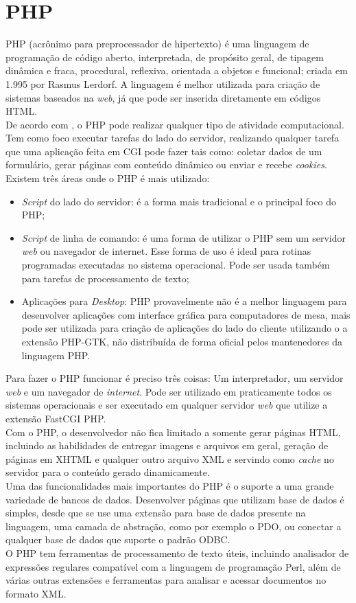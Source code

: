\section{PHP}
PHP (acrônimo para preprocessador de hipertexto) é uma linguagem de programação 
de código aberto, interpretada, de propósito geral, de tipagem dinâmica e 
fraca, procedural, reflexiva, orientada a objetos e funcional; criada em 1.995 
por Rasmus Lerdorf. A linguagem é melhor utilizada para criação de sistemas 
baseados na \textit{web}, já que pode ser inserida diretamente em códigos 
HTML.\\
De acordo com , o PHP pode realizar qualquer tipo de 
atividade computacional. Tem como foco executar tarefas do lado do servidor, 
realizando qualquer tarefa que uma aplicação feita em CGI pode fazer tais como: 
coletar dados de um formulário, gerar páginas com conteúdo dinâmico ou enviar e 
recebe \textit{cookies}. Existem três áreas onde o PHP é mais utilizado:
\begin{itemize}
	\item \textit{Script} do lado do servidor: é a forma mais tradicional e o 
	principal foco do PHP;
	\item \textit{Script} de linha de comando: é uma forma de utilizar o PHP 
	sem um servidor \textit{web} ou navegador de internet. Esse forma de uso é 
	ideal para rotinas programadas executadas no sistema operacional. Pode ser 
	usada também para tarefas de processamento de texto;
	\item Aplicações para \textit{Desktop}: PHP provavelmente não é a melhor 
	linguagem para desenvolver aplicações com interface gráfica para 
	computadores de mesa, mais pode ser utilizada para criação de aplicações do 
	lado do cliente utilizando o a extensão PHP-GTK, não distribuída de forma 
	oficial pelos mantenedores da linguagem PHP.
\end{itemize}
Para fazer o PHP funcionar é preciso três coisas: Um interpretador, um servidor 
\textit{web} e um navegador de \textit{internet}. Pode ser utilizado em 
praticamente todos os sistemas operacionais e ser executado em qualquer 
servidor \textit{web} que utilize a extensão FastCGI PHP.\\
Com o PHP, o desenvolvedor não fica limitado a somente gerar páginas HTML, 
incluindo as habilidades de entregar imagens e arquivos em geral, geração de 
páginas em XHTML e qualquer outro arquivo XML e servindo como \textit{cache} no 
servidor para o conteúdo gerado dinamicamente.\\
Uma das funcionalidades mais importantes do PHP é o suporte a uma grande 
variedade de bancos de dados. Desenvolver páginas que utilizam base de dados é 
simples, desde que se use uma extensão para base de dados presente na 
linguagem, uma camada de abstração, como por exemplo o PDO, ou conectar a 
qualquer base de dados que suporte o padrão ODBC.\\
O PHP tem ferramentas de processamento de texto úteis, incluindo analisador de 
expressões regulares compatível com a linguagem de programação Perl, além de 
várias outras extensões e ferramentas para analisar e acessar documentos no 
formato XML.
